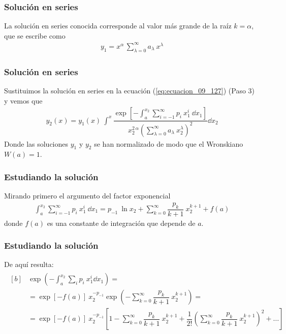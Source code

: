\begin{frame}
\frametitle{Solución en series}
La solución en series conocida corresponde al valor más grande de la raíz $k = \alpha$, que se escribe como
\begin{align*}
y_{1} =  x^{\alpha} \, \sum_{\lambda=0}^{\infty} a_{\lambda} \: x^{\lambda}
\end{align*}
\end{frame}
\begin{frame}
\frametitle{Solución en series}
Sustituimos la solución en series en la ecuación (\ref{eq:ecuacion_09_127}) (Paso 3) y vemos que
\fontsize{12}{12}\selectfont
\begin{align}
y_{2}(x) = y_{1} (x) \: \int^{x} \dfrac{\exp \left[ \displaystyle - \int_{a}^{x_{2}} \sum_{i=-1}^{\infty} p_{i} \: x^{i}_{1} \: \dd{x_{1}} \right] }{x_{2}^{2 \, \alpha} \left( \displaystyle \sum_{\lambda=0}^\infty a_{\lambda} \: x_{2}^{\lambda} \right)^{2} } \dd{x_{2}}
\label{eq:ecuacion_09_135}
\end{align}
Donde las soluciones $y_{1}$ y $y_{2}$ se han normalizado de modo que el Wronskiano $W(a) = 1$.
\end{frame}
\begin{frame}
\frametitle{Estudiando la solución}
Mirando primero el argumento del factor exponencial
{\fontsize{12}{12}\selectfont
\begin{align}
\int_{a}^{x_{2}} \sum_{i=-1}^{\infty} p_{i} \: x_{1}^{i} \: \dd{x_{1}} = p_{-1} \: \ln x_{2} + \sum_{k=0}^{\infty} \dfrac{p_{k}}{k + 1} \: x_{2}^{k + 1} + f(a)
\label{eq:ecuacion_09_136}
\end{align}}
donde $f(a)$ es una constante de integración que depende de $a$.
\end{frame}
\begin{frame}
\frametitle{Estudiando la solución}
De aquí resulta:
\fontsize{10}{10}\selectfont
\begin{align}
\begin{aligned}[b]
&{}\exp \left( - \int_{a}^{x_{2}} \sum_{i} p_{i} \: x_{1}^{i} \dd{x_{1}} \right) =  \\
&= \exp [ - f(a) ] \: x_{2}^{-p_{-1}} \exp \left( - \sum_{k=0}^{\infty} \dfrac{p_{k}}{k+1} \: x_{2}^{k+1} \right) = \\
&= \exp [ - f(a) ] \: x_{2}^{-p_{-1}} \left[ 1 - \sum_{k=0}^{\infty} \dfrac{p_{k}}{k+1} \: x_{2}^{k+1} + \dfrac{1}{2!} \left( \sum_{k=0}^{\infty} \dfrac{p_{k}}{k+1} \: x_{2}^{k+1} \right)^{2} + \ldots \right]
\end{aligned}
\label{eq:ecuacion_09_137}
\end{align}
\end{frame}
